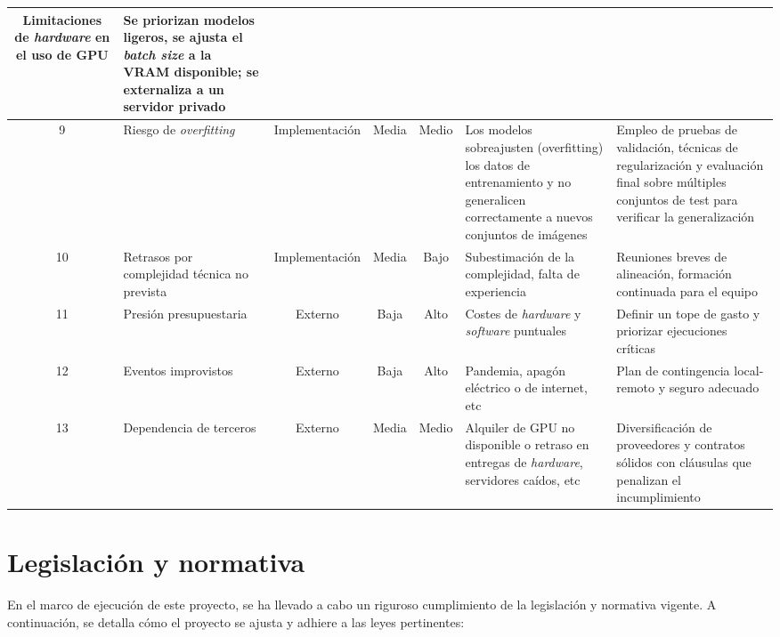 \documentclass[12pt,a4paper,onecolumn,oneside]{report}
\begin{document}
\begin{table}[H]
{\begin{tabular}{|c|m{3cm}|c|c|c|m{5.5cm}|m{5.5cm}|}
Limitaciones de \textit{hardware} en el uso de GPU & 
Se priorizan modelos ligeros, se ajusta el \textit{batch size} a la VRAM disponible; se externaliza a un servidor privado \\
\hline
9 & Riesgo de \textit{overfitting} & Implementación & Media & Medio & 
Los modelos sobreajusten (overfitting) los datos de entrenamiento y no generalicen correctamente a nuevos conjuntos de imágenes & 
Empleo de pruebas de validación, técnicas de regularización y evaluación final sobre múltiples conjuntos de test para verificar la generalización \\
\hline
10 & Retrasos por complejidad técnica no prevista & Implementación & Media & Bajo & 
Subestimación de la complejidad, falta de experiencia & 
Reuniones breves de alineación, formación continuada para el equipo \\
\hline
11 & Presión presupuestaria & Externo & Baja & Alto & 
Costes de \textit{hardware} y \textit{software} puntuales & 
Definir un tope de gasto y priorizar ejecuciones críticas\\
\hline
12 & Eventos improvistos & Externo & Baja & Alto & 
Pandemia, apagón eléctrico o de internet, etc & 
Plan de contingencia local-remoto y seguro adecuado\\
\hline
13 & Dependencia de terceros & Externo & Media & Medio & 
Alquiler de GPU no disponible o retraso en entregas de \textit{hardware}, servidores caídos, etc & 
Diversificación de proveedores y contratos sólidos con cláusulas que penalizan el incumplimiento\\
\hline
\end{tabular}
}
\label{tab:analisis_riesgos}
\end{table}

\section{Legislación y normativa}
\label{Legislación y normativa}

En el marco de ejecución de este proyecto, se ha llevado a cabo un riguroso cumplimiento de la legislación y normativa vigente. A continuación, 
se detalla cómo el proyecto se ajusta y adhiere a las leyes pertinentes:
\end{document}
